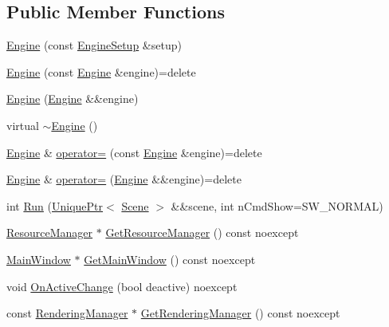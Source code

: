 \subsection*{Public Member Functions}
\begin{DoxyCompactItemize}
\item 
\hyperlink{classmage_1_1_engine_a99770cbb017b29c284d7f8e4c7e2b84c}{Engine} (const \hyperlink{structmage_1_1_engine_setup}{Engine\+Setup} \&setup)
\item 
\hyperlink{classmage_1_1_engine_afd2f4f32b2e803f59521aafe1924f0ba}{Engine} (const \hyperlink{classmage_1_1_engine}{Engine} \&engine)=delete
\item 
\hyperlink{classmage_1_1_engine_a69ee5a698bf54da107ebaa7839812840}{Engine} (\hyperlink{classmage_1_1_engine}{Engine} \&\&engine)
\item 
virtual \hyperlink{classmage_1_1_engine_a34628556f8397d70ed018d71e343c2f5}{$\sim$\+Engine} ()
\item 
\hyperlink{classmage_1_1_engine}{Engine} \& \hyperlink{classmage_1_1_engine_a1eedff82d4c8207c61676230520648fd}{operator=} (const \hyperlink{classmage_1_1_engine}{Engine} \&engine)=delete
\item 
\hyperlink{classmage_1_1_engine}{Engine} \& \hyperlink{classmage_1_1_engine_a22607a263e0be5e179cc0e4bf13b18f7}{operator=} (\hyperlink{classmage_1_1_engine}{Engine} \&\&engine)=delete
\item 
int \hyperlink{classmage_1_1_engine_a4ad554bca1ac892e1274f2e707c2a017}{Run} (\hyperlink{namespacemage_a3316d7143a973e37adf1110f2e80ca31}{Unique\+Ptr}$<$ \hyperlink{classmage_1_1_scene}{Scene} $>$ \&\&scene, int n\+Cmd\+Show=S\+W\+\_\+\+N\+O\+R\+M\+AL)
\item 
\hyperlink{classmage_1_1_resource_manager}{Resource\+Manager} $\ast$ \hyperlink{classmage_1_1_engine_a8b89ee555f5208a99872d724389eba0b}{Get\+Resource\+Manager} () const noexcept
\item 
\hyperlink{classmage_1_1_main_window}{Main\+Window} $\ast$ \hyperlink{classmage_1_1_engine_a56e7cbf3a781bd519ed79f0a75a9ce86}{Get\+Main\+Window} () const noexcept
\item 
void \hyperlink{classmage_1_1_engine_afd52a8088d6d37605cb352028098c508}{On\+Active\+Change} (bool deactive) noexcept
\item 
const \hyperlink{classmage_1_1_rendering_manager}{Rendering\+Manager} $\ast$ \hyperlink{classmage_1_1_engine_ae3d894eacf94cdf416d95c57e45b4836}{Get\+Rendering\+Manager} () const noexcept
\item 

\end{DoxyCompactItemize}
